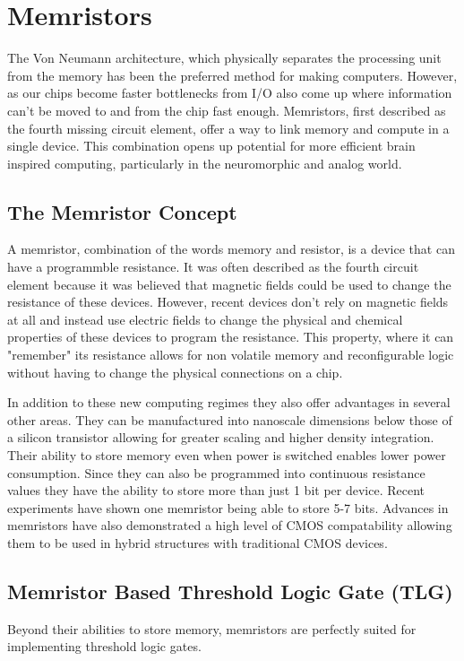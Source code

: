 \documentclass[sigconf,authordraft]{acmart}
\begin{document}
\section{Memristors}
The Von Neumann architecture, which physically separates the processing 
unit from the memory has been the preferred method for making computers. 
However, as our chips become faster bottlenecks from I/O also come up 
where information can't be moved to and from the chip fast enough. Memristors, 
first described as the fourth missing circuit element, offer a way 
to link memory and compute in a single device. This combination opens up
potential for more efficient brain inspired computing, particularly 
in the neuromorphic and analog world. 

\subsection{The Memristor Concept}
A memristor, combination of the words memory and resistor, is a device 
that can have a programmble resistance. It was often described as 
the fourth circuit element because it was believed that magnetic fields 
could be used to change the resistance of these devices. However, recent 
devices don't rely on magnetic fields at all and instead use electric fields 
to change the physical and chemical properties of these devices to program 
the resistance. This property, where it can "remember" its resistance allows 
for non volatile memory and reconfigurable logic without having to change 
the physical connections on a chip.

In addition to these new computing regimes they also offer advantages 
in several other areas. They can be manufactured into nanoscale 
dimensions below those of a silicon transistor allowing for greater scaling 
and higher density integration. Their ability to store memory even 
when power is switched enables lower power consumption. Since they can 
also be programmed into continuous resistance values they have the 
ability to store more than just 1 bit per device. Recent experiments
have shown one memristor being able to store 5-7 bits. Advances 
in memristors have also demonstrated a high level of CMOS compatability 
allowing them to be used in hybrid structures with traditional CMOS 
devices. 

\subsection{Memristor Based Threshold Logic Gate (TLG)}
Beyond their abilities to store memory, memristors are perfectly suited 
for implementing threshold logic gates. 
\end{document}
